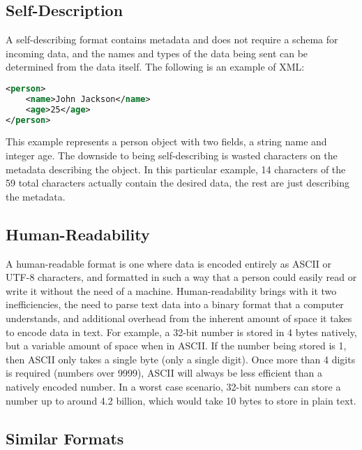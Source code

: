 \documentclass[conference]{IEEEtran}
\begin{document}
\subsection{Self-Description}

A self-describing format contains metadata and does not require a schema for incoming data, and the names and types of the data being sent can be determined from the data itself. The following is an example of XML:

\begin{lstlisting}[language=XML]
<person>
	<name>John Jackson</name>
	<age>25</age>
</person>
\end{lstlisting}

This example represents a person object with two fields, a string name and integer age. The downside to being self-describing is wasted characters on the metadata describing the object. In this particular example, 14 characters of the 59 total characters actually contain the desired data, the rest are just describing the metadata.

%

\subsection{Human-Readability}

A human-readable format is one where data is encoded entirely as ASCII or UTF-8 characters, and formatted in such a way that a person could easily read or write it without the need of a machine. Human-readability brings with it two inefficiencies, the need to parse text data into a binary format that a computer understands, and additional overhead from the inherent amount of space it takes to encode data in text. For example, a 32-bit number is stored in 4 bytes natively, but a variable amount of space when in ASCII. If the number being stored is 1, then ASCII only takes a single byte (only a single digit). Once more than 4 digits is required (numbers over 9999), ASCII will always be less efficient than a natively encoded number. In a worst case scenario, 32-bit numbers can store a number up to around 4.2 billion, which would take 10 bytes to store in plain text.

\subsection{Similar Formats}
\end{document}
